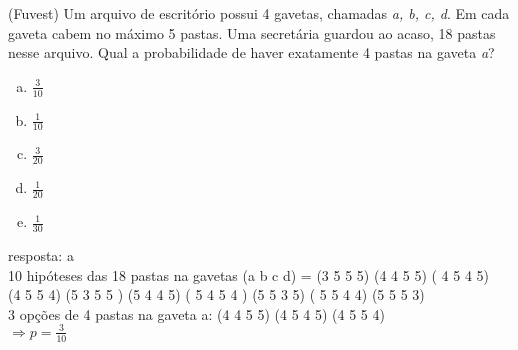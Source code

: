 \begin{ex}
(Fuvest) Um arquivo de escritório possui 4 gavetas, chamadas \textit{a, b, c, d}. Em cada gaveta cabem no máximo 5 pastas. Uma secretária guardou ao acaso, 18 pastas nesse arquivo. Qual a probabilidade de haver exatamente 4 pastas na gaveta \textit{a}?
   \begin{enumerate}[(a)]
   \item $\frac{3}{10}$
   \item $\frac{1}{10}$
   \item $\frac{3}{20}$
   \item $\frac{1}{20}$
   \item $\frac{1}{30}$
   \end{enumerate}
     \begin{sol}
       resposta: a\\
    10 hipóteses das 18 pastas na gavetas (a b c d) = (3 5 5 5) (4 4 5 5) ( 4 5 4 5) \\(4 5 5 4)  (5 3 5 5 ) (5 4 4 5) ( 5 4 5 4 ) (5 5 3 5) ( 5 5 4 4) (5 5 5 3) \\
    3 opções de 4 pastas na gaveta a: (4 4 5 5) (4 5 4 5) (4 5 5 4) \\
   $\Longrightarrow p=\frac{3}{10}$
     \end{sol}
\end{ex}